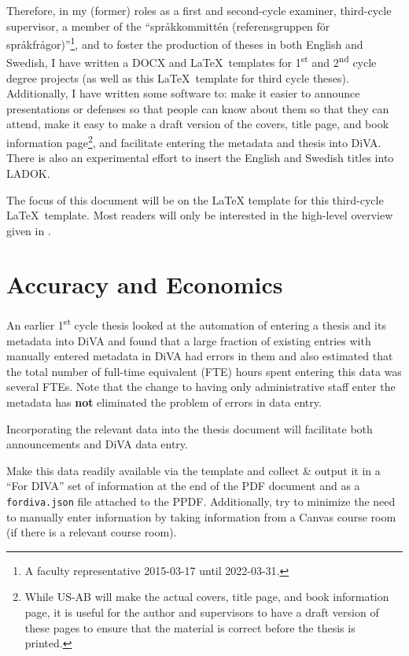 \documentclass[12pt, twoside]{article}
\newcommand{\fname}[1]{\texttt{#1}}
\begin{document}
Therefore, in my (former) roles as a first and second-cycle examiner, third-cycle supervisor, a member of the “\foreignlanguage{swedish}{språkkommittén (referensgruppen för språkfrågor})”\footnote{A faculty representative 2015-03-17 until 2022-03-31.}, and to foster the production of theses in both English and Swedish, I have written a DOCX and \LaTeX~templates for 1\textsuperscript{st} and 2\textsuperscript{nd} cycle degree projects (as well as this \LaTeX~template for third cycle theses). Additionally, I have written some software to: \first make it easier to announce presentations or defenses so that people can know about them so that they can attend, \Second make it easy to make a draft version of the covers, title page, and book information page\footnote{While US-AB will make the actual covers, title page, and book information page, it is useful for the author and supervisors to have a draft version of these pages to ensure that the material is correct before the thesis is printed.}, and \third facilitate entering the metadata and thesis into \gls{DiVA}. There is also an experimental effort to insert the English and Swedish titles into \gls{LADOK}.

The focus of this document will be on the \LaTeX{}  template for this third-cycle \LaTeX{}~template. 
Most readers will only be interested in the high-level overview given in .


\section{Accuracy and Economics}
\label{sec:accuracyAndEconomics}

An earlier 1\textsuperscript{st} cycle thesis looked at the automation of entering a thesis and its metadata into \gls{DiVA} and found that a large fraction of existing entries with manually entered metadata in \gls{DiVA} had errors in them and also estimated that the total number of full-time equivalent (FTE) hours spent entering this data was several FTEs\cite{BesharatPour_and_Li_2019}. Note that the change to having only administrative staff enter the metadata has \textbf{not} eliminated the problem of errors in data entry.
\begin{description}[labelwidth =\widthof{\textbf{Hypothesis}}, leftmargin = !]
\item[Hypothesis] Incorporating the relevant data into the thesis document will facilitate both announcements and \gls{DiVA} data entry.

\item[Approach] Make this data readily available via the template and collect \& output it in a 
\enquote{For DIVA} set of information at the end of the \gls{PDF} document and as a \fname{fordiva.json} file attached to the P\gls{PDF}. Additionally, try to minimize the need to manually enter information by taking information from a Canvas course room (if there is a relevant course room).
\end{description}
\end{document}
